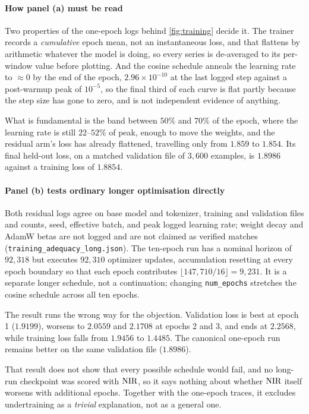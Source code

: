 \paragraph{How panel (a) must be read} Two properties of the one-epoch logs behind
\cref{fig:training} decide it. The trainer records a
\emph{cumulative} epoch mean, not an instantaneous loss, and that flattens by
arithmetic whatever the model is doing, so every series is de-averaged to its
per-window value before plotting. And the cosine schedule anneals the learning
rate to $\approx 0$ by the end of the epoch, $2.96 \times 10^{-10}$ at the last
logged step against a post-warmup peak of $10^{-5}$, so the final third of each
curve is flat partly because the step size has gone to zero, and is not
independent evidence of anything.

What is fundamental is the band between $50\%$ and $70\%$ of the epoch, where
the learning rate is still $22$--$52\%$ of peak, enough to move the weights, and
the residual arm's loss has already flattened, travelling only from $1.859$ to
$1.854$. Its final held-out loss, on a matched validation file of $3{,}600$
examples, is $1.8986$ against a training loss of $1.8854$.

\paragraph{Panel (b) tests ordinary longer optimisation directly} Both residual
logs agree on base model and tokenizer,
training and validation files and counts, seed, effective batch, and peak logged
learning rate; weight decay and AdamW betas are not logged and are not claimed
as verified matches (\texttt{training\_adequacy\_}\allowbreak\texttt{long.json}). The ten-epoch run
has a nominal horizon of $92{,}318$ but executes $92{,}310$ optimizer updates,
accumulation resetting at every epoch boundary so that each epoch contributes
$\lfloor147{,}710/16\rfloor=9{,}231$. It is a separate longer schedule, not a
continuation; changing \texttt{num\_epochs} stretches the cosine schedule across
all ten epochs.

The result runs the wrong way for the objection. Validation loss is best at
epoch 1 ($1.9199$), worsens to $2.0559$ and $2.1708$ at epochs 2 and 3, and ends
at $2.2568$, while training loss falls from $1.9456$ to $1.4485$. The canonical
one-epoch run remains better on the same validation file ($1.8986$).

\begin{scopelimit}
That result does not show that every possible schedule would fail, and no
long-run checkpoint was scored with $\textrm{NIR}$, so it says nothing about whether
$\textrm{NIR}$ itself worsens with additional epochs. Together with the one-epoch
traces, it excludes undertraining as a \emph{trivial} explanation, not as a
general one.
\end{scopelimit}

